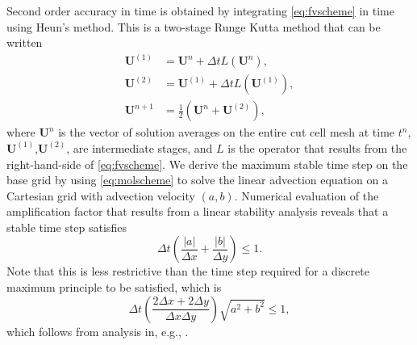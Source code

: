 Second order accuracy in time is obtained by integrating \eqref{eq:fvscheme} in time using Heun's method.  This is a two-stage Runge Kutta method that can be written
\begin{equation}\label{eq:molscheme}
\begin{aligned}
	\mathbf{U}^{(1)} &= \mathbf{U}^{n} + \Delta t L(\mathbf{U}^n), \\
	\mathbf{U}^{(2)} &= \mathbf{U}^{(1)} + \Delta t L(\mathbf{U}^{(1)}), \\
	\mathbf{U}^{n+1} &= \frac{1}{2}( \mathbf{U}^{n} + \mathbf{U}^{(2)} ) ,	
\end{aligned}
\end{equation}
where $\mathbf{U}^{n}$ is the vector of solution averages on the entire cut cell mesh at time $t^n$, $\mathbf{U}^{(1)}$,$\mathbf{U}^{(2)}$, are intermediate stages, and $L$ is the operator that results from the right-hand-side of \eqref{eq:fvscheme}.
We derive the maximum stable time step on the base grid by using \eqref{eq:molscheme} to solve the linear advection equation on a Cartesian grid with advection velocity $(a,b)$.
Numerical evaluation of the amplification factor that results from a linear stability analysis reveals that a stable time step satisfies
\begin{equation}\label{eq:vn1}
\Delta t   \left( \frac{|a|}{\Delta x} + \frac{|b|}{\Delta y} \right)\leq 1.
\end{equation}
Note that this is less restrictive than the time step required for a discrete maximum principle to be satisfied, which is 
\begin{equation}
\Delta t  \left( \frac{2\Delta x + 2 \Delta y}{\Delta x \Delta y} \right) \sqrt{a^2 + b^2}\leq 1,
\end{equation}
which follows from analysis in, e.g., \cite{giuliani2018analysis}.

